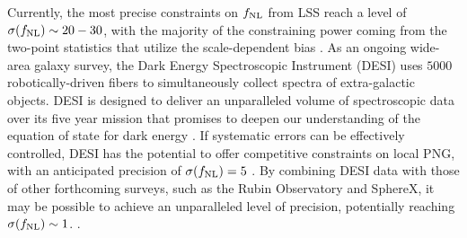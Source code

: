  Currently, the most precise constraints on $f_{\rm NL}$ from LSS reach a level of $\sigma(f_{\rm NL}) \sim 20-30$, with the majority of the constraining power coming from the two-point statistics that utilize the scale-dependent bias \citep{2019JCAP...09..010C, mueller2022primordial, 2022PhRvD.106d3506C, 2022arXiv220111518D}. As an ongoing wide-area galaxy survey, the Dark Energy Spectroscopic Instrument (DESI) uses $5000$ robotically-driven fibers to simultaneously collect spectra of extra-galactic objects. DESI is designed to deliver an unparalleled volume of spectroscopic data over its five year mission that promises to deepen our understanding of the equation of state for dark energy \citep{aghamousa2016desi}. If systematic errors can be effectively controlled, DESI has the potential to offer competitive constraints on local PNG, with an anticipated precision of $\sigma(f_{\rm NL})=5$ \citep{aghamousa2016desi}. By combining DESI data with those of other forthcoming surveys, such as the Rubin Observatory and SphereX, it may be possible to achieve an unparalleled level of precision, potentially reaching $\sigma (f_{\rm NL}) \sim 1$. \citep[see, e.g.,][]{Heinrich2022AAS...24020203H}.



